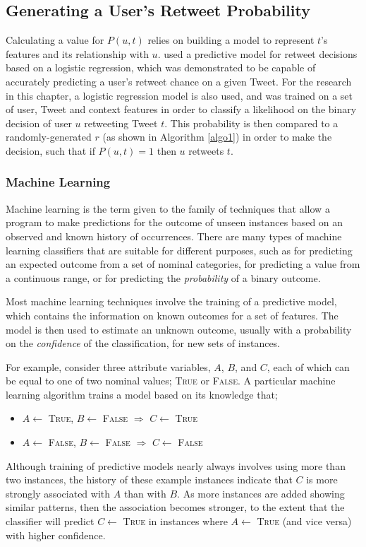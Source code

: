 \subsection{Generating a User's Retweet Probability} 
Calculating a value for $P(u,t)$ relies on building a model to represent $t$'s features and its relationship with $u$. \citet{zhu11} used a predictive model for retweet decisions based on a logistic regression, which was demonstrated to be capable of accurately predicting a user's retweet chance on a given Tweet. For the research in this chapter, a logistic regression model is also used, and was trained on a set of user, Tweet and context features in order to classify a likelihood on the binary decision of user $u$ retweeting Tweet $t$. This probability is then compared to a randomly-generated $r$ (as shown in Algorithm \ref{algo1}) in order to make the decision, such that if $P(u,t) = 1$ then $u$ retweets $t$. 


\subsubsection{Machine Learning}
Machine learning is the term given to the family of techniques that allow a program to make predictions for the outcome of unseen instances based on an observed and known history of occurrences. There are many types of machine learning classifiers that are suitable for different purposes, such as for predicting an expected outcome from a set of nominal categories, for predicting a value from a continuous range, or for predicting the \textit{probability} of a binary outcome.

Most machine learning techniques involve the training of a predictive model, which contains the information on known outcomes for a set of features. The model is then used to estimate an unknown outcome, usually with a probability on the \textit{confidence} of the classification, for new sets of instances.

For example, consider three attribute variables, $A$, $B$, and $C$, each of which can be equal to one of two nominal values; \textsc{True} or \textsc{False}. A particular machine learning algorithm trains a model based on its knowledge that;
\begin{itemize}
    \item $A\gets$ \textsc{True}, $B\gets$ \textsc{False} $\Longrightarrow$ $C\gets$ \textsc{True}
    \item $A\gets$ \textsc{False}, $B\gets$ \textsc{False} $\Longrightarrow$ $C\gets$ \textsc{False}
\end{itemize}
Although training of predictive models nearly always involves using more than two instances, the history of these example instances indicate that $C$ is more strongly associated with $A$ than with $B$. As more instances are added showing similar patterns, then the association becomes stronger, to the extent that the classifier will predict $C\gets$ \textsc{True} in instances where $A\gets$ \textsc{True} (and vice versa) with higher confidence.

